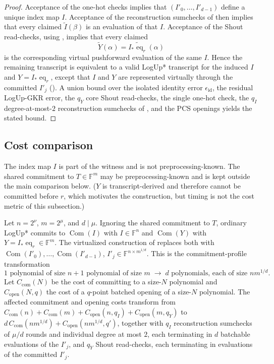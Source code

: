 \begin{proof}
Acceptance of the one-hot checks implies that $(I'_0,\ldots,I'_{d-1})$ define a unique index map $I$.
Acceptance of the reconstruction sumchecks of  then implies that every claimed $\widetilde{I}(\beta)$ is an evaluation of that $I$.
Acceptance of the Shout read-checks, using , implies that every claimed
\[
\widetilde{Y}(\alpha)
=
\widetilde{I_*\operatorname{eq}_r}(\alpha)
\]
is the corresponding virtual pushforward evaluation of the same $I$.
Hence the remaining transcript is equivalent to a valid LogUp* transcript for the induced $I$ and $Y=I_*\operatorname{eq}_r$,
except that $I$ and $Y$ are represented virtually through the committed $I'_j$
().
A union bound over the isolated identity error $\epsilon_{\mathrm{id}}$,
the residual LogUp-GKR error,
the $q_Y$ core Shout read-checks,
the single one-hot check,
the $q_I$ degree-at-most-$2$ reconstruction sumchecks of ,
and the PCS openings yields the stated bound.
\end{proof}

\subsection{Cost comparison}

The index map $I$ is part of the witness and is not preprocessing-known.
The shared commitment to $T\in\mathbb{F}^m$ may be preprocessing-known and is kept outside the main comparison below.
($Y$ is transcript-derived and therefore cannot be committed before $r$, which motivates the construction, but timing is not the cost metric of this subsection.)

\begin{theorem}\label{thm:cost}
Let $n=2^\nu$, $m=2^\mu$, and $d\mid\mu$.
Ignoring the shared commitment to $T$, ordinary LogUp* commits to
$\operatorname{Com}(I)$ with $I\in\mathbb{F}^n$ and
$\operatorname{Com}(Y)$ with $Y=I_*\operatorname{eq}_r\in\mathbb{F}^m$.
The virtualized construction of  replaces both with
$\operatorname{Com}(I'_0),\ldots,\operatorname{Com}(I'_{d-1})$,
$I'_j\in\mathbb{F}^{n\times m^{1/d}}$.
This is the commitment-profile transformation
\[
\boxed{
1\text{ polynomial of size }n
+
1\text{ polynomial of size }m
\;\longrightarrow\;
d\text{ polynomials, each of size }nm^{1/d}.
}
\]
Let $C_{\mathrm{com}}(N)$ be the cost of committing to a size-$N$ polynomial and
$C_{\mathrm{open}}(N,q)$ the cost of a $q$-point batched opening of a size-$N$ polynomial.
The affected commitment and opening costs transform from
$C_{\mathrm{com}}(n)+C_{\mathrm{com}}(m)+C_{\mathrm{open}}(n,q_I)+C_{\mathrm{open}}(m,q_Y)$
to
$d\,C_{\mathrm{com}}(nm^{1/d})+C_{\mathrm{open}}(nm^{1/d},q')$,
together with $q_I$ reconstruction sumchecks of $\mu/d$ rounds and individual degree at most $2$,
each terminating in $d$ batchable evaluations of the $I'_j$,
and $q_Y$ Shout read-checks, each terminating in evaluations of the committed $I'_j$.
\end{theorem}

